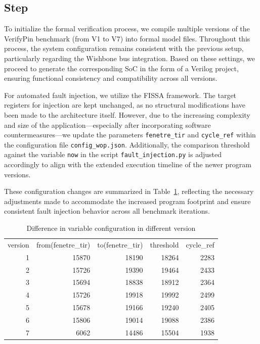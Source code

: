 \subsection{Step}
To initialize the formal verification process, we compile multiple versions of the VerifyPin benchmark (from V1 to V7) into formal model files. Throughout this process, the system configuration remains consistent with the previous setup, particularly regarding the Wishbone bus integration. Based on these settings, we proceed to generate the corresponding SoC in the form of a Verilog project, ensuring functional consistency and compatibility across all versions.

For automated fault injection, we utilize the FISSA framework. The target registers for injection are kept unchanged, as no structural modifications have been made to the architecture itself. However, due to the increasing complexity and size of the application—especially after incorporating software countermeasures—we update the parameters \texttt{fenetre\_tir} and \texttt{cycle\_ref} within the configuration file \texttt{config\_wop.json}. Additionally, the comparison threshold against the variable \texttt{now} in the script \texttt{fault\_injection.py} is adjusted accordingly to align with the extended execution timeline of the newer program versions.

These configuration changes are summarized in Table~\ref{tab:variable configuration}, reflecting the necessary adjustments made to accommodate the increased program footprint and ensure consistent fault injection behavior across all benchmark iterations.

\begin{table}[]
  \caption{Difference in variable configuration in different version}
  \label{tab:variable configuration}
\begin{tabular}{rrrrr}
\multicolumn{1}{l}{version} & \multicolumn{1}{l}{from(fenetre\_tir)} & \multicolumn{1}{l}{to(fenetre\_tir)} & \multicolumn{1}{l}{threshold} & \multicolumn{1}{l}{cycle\_ref} \\
1 & 15870 & 18190 & 18264 & 2283 \\
2 & 15726 & 19390 & 19464 & 2433 \\
3 & 15694 & 18838 & 18912 & 2364 \\
4 & 15726 & 19918 & 19992 & 2499 \\
5 & 15678 & 19166 & 19240 & 2405 \\
6 & 15806 & 19014 & 19088 & 2386 \\
7 & 6062 & 14486 & 15504 & 1938
\end{tabular}
\end{table}

